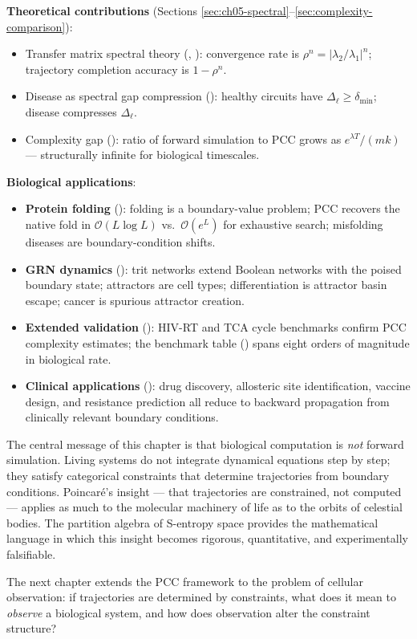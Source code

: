 \medskip
\noindent\textbf{Theoretical contributions} (Sections
\ref{sec:ch05-spectral}--\ref{sec:complexity-comparison}):
\begin{itemize}
    \item Transfer matrix spectral theory (,
          ): convergence rate is
          $\rho^n = |\lambda_2/\lambda_1|^n$; trajectory completion
          accuracy is $1 - \rho^n$.
    \item Disease as spectral gap compression
          (): healthy circuits have
          $\Delta_\ell \geq \delta_{\min}$; disease compresses $\Delta_\ell$.
    \item Complexity gap (): ratio of forward
          simulation to PCC grows as $e^{\lambda T}/(mk)$ --- structurally
          infinite for biological timescales.
\end{itemize}

\medskip
\noindent\textbf{Biological applications}:
\begin{itemize}
    \item \textbf{Protein folding} (): folding
          is a boundary-value problem; PCC recovers the native fold in
          $\mathcal{O}(L \log L)$ vs.\ $\mathcal{O}(e^L)$ for exhaustive
          search; misfolding diseases are boundary-condition shifts.
    \item \textbf{GRN dynamics} (): trit networks extend
          Boolean networks with the poised boundary state; attractors are
          cell types; differentiation is attractor basin escape; cancer is
          spurious attractor creation.
    \item \textbf{Extended validation} ():
          HIV-RT and TCA cycle benchmarks confirm PCC complexity estimates;
          the benchmark table () spans eight orders
          of magnitude in biological rate.
    \item \textbf{Clinical applications} ():
          drug discovery, allosteric site identification, vaccine design, and
          resistance prediction all reduce to backward propagation from
          clinically relevant boundary conditions.
\end{itemize}

\medskip
The central message of this chapter is that biological computation is
\emph{not} forward simulation.  Living systems do not integrate dynamical
equations step by step; they satisfy categorical constraints that determine
trajectories from boundary conditions.  Poincaré's insight --- that
trajectories are constrained, not computed --- applies as much to the
molecular machinery of life as to the orbits of celestial bodies.  The
partition algebra of S-entropy space provides the mathematical language in
which this insight becomes rigorous, quantitative, and experimentally
falsifiable.

The next chapter extends the PCC framework to the problem of cellular
observation: if trajectories are determined by constraints, what does it
mean to \emph{observe} a biological system, and how does observation alter
the constraint structure?
